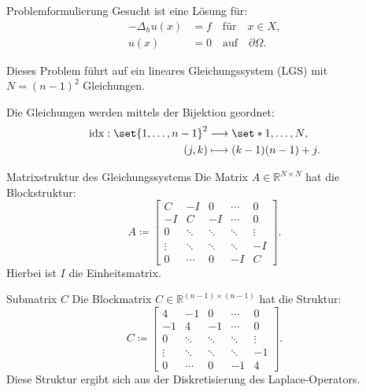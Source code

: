 \documentclass[9pt, t]{beamer}
\newcommand\R{\mathbb{R}}
\begin{document}
\begin{frame}{Problemformulierung}
    Gesucht ist eine Lösung für:
    \begin{align*}
        -\Delta_h u(x) & = f \quad \text{für} \quad x \in X,         \\
        u(x)           & = 0 \quad \text{auf} \quad \partial \Omega.
    \end{align*}
    \pause%

    Dieses Problem führt auf ein lineares Gleichungssystem (LGS) mit \(N =
    {(n-1)}^2\) Gleichungen.

    Die Gleichungen werden mittels der Bijektion geordnet:
    \begin{align*}
        \operatorname{idx}: \set{1, \ldots, n - 1}^2 & \longrightarrow \set*{1, \ldots , N}, \\
        (j, k)                                       & \longmapsto (k - 1)(n - 1) + j.
    \end{align*}
\end{frame}

\begin{frame}{Matrixstruktur des Gleichungssystems}
    Die Matrix \(A \in \R^{N \times N}\) hat die Blockstruktur:
    \[
        A \coloneq
        \begin{bmatrix}
            C      & -I     & 0      & \cdots & 0      \\
            -I     & C      & -I     & \cdots & 0      \\
            0      & \ddots & \ddots & \ddots & \vdots \\
            \vdots & \ddots & \ddots & \ddots & -I     \\
            0      & \cdots & 0      & -I     & C
        \end{bmatrix}.
    \]
    \pause%
    Hierbei ist \(I\) die Einheitsmatrix.
\end{frame}

\begin{frame}{Submatrix \(C\)}
    Die Blockmatrix \(C \in \R^{(n-1) \times (n-1)}\) hat die Struktur:
    \[
        C \coloneq
        \begin{bmatrix}
            4      & -1     & 0      & \cdots & 0      \\
            -1     & 4      & -1     & \cdots & 0      \\
            0      & \ddots & \ddots & \ddots & \vdots \\
            \vdots & \ddots & \ddots & \ddots & -1     \\
            0      & \cdots & 0      & -1     & 4
        \end{bmatrix}.
    \]
    \pause%
    Diese Struktur ergibt sich aus der Diskretisierung des Laplace-Operators.
\end{frame}
\end{document}

